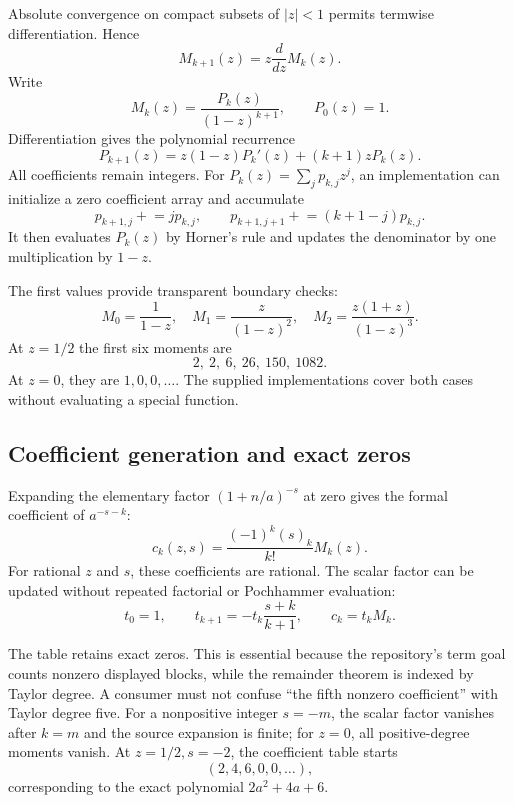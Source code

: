 \documentclass[11pt,letterpaper]{article}
\begin{document}
Absolute convergence on compact subsets of $|z|<1$ permits termwise differentiation. Hence
\[
 M_{k+1}(z)=z\frac{d}{dz}M_k(z).
\]
Write
\begin{equation}
 M_k(z)=\frac{P_k(z)}{(1-z)^{k+1}},\qquad P_0(z)=1.
 \label{eq:numerator}
\end{equation}
Differentiation gives the polynomial recurrence
\begin{equation}
 P_{k+1}(z)=z(1-z)P_k'(z)+(k+1)zP_k(z).
 \label{eq:eulerian}
\end{equation}
All coefficients remain integers. For $P_k(z)=\sum_j p_{k,j}z^j$, an implementation can initialize a zero coefficient array and accumulate
\begin{equation}
 p_{k+1,j}\mathrel{+}=j p_{k,j},\qquad
 p_{k+1,j+1}\mathrel{+}=(k+1-j)p_{k,j}.
 \label{eq:array}
\end{equation}
It then evaluates $P_k(z)$ by Horner's rule and updates the denominator by one multiplication by $1-z$.

The first values provide transparent boundary checks:
\[
 M_0=\frac1{1-z},\quad M_1=\frac{z}{(1-z)^2},\quad
 M_2=\frac{z(1+z)}{(1-z)^3}.
\]
At $z=1/2$ the first six moments are
\[
 2,\ 2,\ 6,\ 26,\ 150,\ 1082.
\]
At $z=0$, they are $1,0,0,\ldots$. The supplied implementations cover both cases without evaluating a special function.

\subsection{Coefficient generation and exact zeros}
Expanding the elementary factor $(1+n/a)^{-s}$ at zero gives the formal coefficient of $a^{-s-k}$:
\begin{equation}
 c_k(z,s)=\frac{(-1)^k(s)_k}{k!}M_k(z).
 \label{eq:lerch-coeff}
\end{equation}
For rational $z$ and $s$, these coefficients are rational. The scalar factor can be updated without repeated factorial or Pochhammer evaluation:
\begin{equation}
 t_0=1,\qquad t_{k+1}=-t_k\frac{s+k}{k+1},\qquad c_k=t_kM_k.
\end{equation}

The table retains exact zeros. This is essential because the repository's term goal counts nonzero displayed blocks, while the remainder theorem is indexed by Taylor degree. A consumer must not confuse ``the fifth nonzero coefficient'' with Taylor degree five. For a nonpositive integer $s=-m$, the scalar factor vanishes after $k=m$ and the source expansion is finite; for $z=0$, all positive-degree moments vanish. At $z=1/2,s=-2$, the coefficient table starts
\[
 (2,4,6,0,0,\ldots),
\]
corresponding to the exact polynomial $2a^2+4a+6$.
\end{document}
